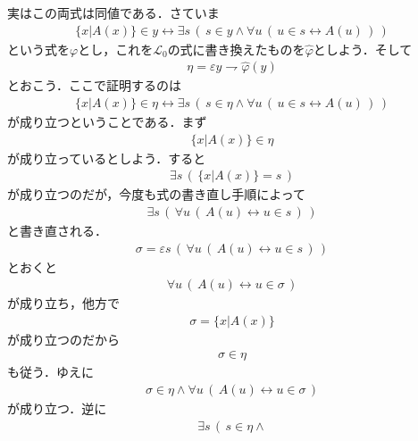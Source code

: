 \documentclass[a4j,10.5pt,oneside,openany]{jsbook}
\theoremstyle{mystyle}
\begin{document}
\begin{itemize}
			実はこの両式は同値である．さていま
			\begin{align}
				\{x|A(x)\} \in y \leftrightarrow
				\exists s\, \left(\, s \in y \wedge 
				\forall u\, \left(\, u \in s \leftrightarrow A(u)\, \right)\, \right)
			\end{align}
			という式を$\varphi$とし，これを$\mathcal{L}_{0}$の式に書き換えたものを$\hat{\varphi}$としよう．そして
			\begin{align}
				\eta = \varepsilon y \rightharpoondown \hat{\varphi}(y)
			\end{align}
			とおこう．ここで証明するのは
			\begin{align}
				\{x|A(x)\} \in \eta \leftrightarrow
				\exists s\, \left(\, s \in \eta \wedge 
				\forall u\, \left(\, u \in s \leftrightarrow A(u)\, \right)\, \right)
			\end{align}
			が成り立つということである．まず
			\begin{align}
				\{x|A(x)\} \in \eta
			\end{align}
			が成り立っているとしよう．すると
			\begin{align}
				\exists s\, \left(\, \{x|A(x)\} = s\, \right)
			\end{align}
			が成り立つのだが，今度も式の書き直し手順によって
			\begin{align}
				\exists s\, \left(\, \forall u\, \left(\, A(u) \leftrightarrow
				u \in s\, \right)\, \right)
			\end{align}
			と書き直される．
			\begin{align}
				\sigma = \varepsilon s\, \left(\, \forall u\, \left(\, A(u) \leftrightarrow
				u \in s\, \right)\, \right)
			\end{align}
			とおくと
			\begin{align}
				\forall u\, \left(\, A(u) \leftrightarrow
				u \in \sigma\, \right)
			\end{align}
			が成り立ち，他方で
			\begin{align}
				\sigma = \{x|A(x)\}
			\end{align}
			が成り立つのだから
			\begin{align}
				\sigma \in \eta
			\end{align}
			も従う．ゆえに
			\begin{align}
				\sigma \in \eta \wedge \forall u\, \left(\, A(u) \leftrightarrow
				u \in \sigma\, \right)
			\end{align}
			が成り立つ．逆に
			\begin{align}
				\exists s\, \left(\, s \in \eta \wedge 

\end{align}
\end{itemize}
\end{document}
